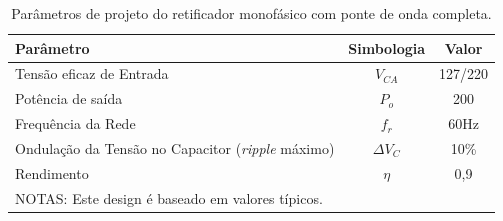 \begin{table}[H]
    \centering
    \footnotesize
    \caption{Parâmetros de projeto do retificador monofásico com ponte de onda completa.}
    \label{retificador}
    \begin{adjustbox}{max width = \textwidth}
        \begin{tabular}{|l|c|c|}
            \hline
            \rowcolor[HTML]{A8DADC}
            \textbf{Parâmetro} & \textbf{Simbologia} & \textbf{Valor}  \\ \hline
            Tensão eficaz de Entrada & $V_{CA}$ & 127/220
            \\ \hline
              Potência de saída & $P_{o}$	 & 200
             \\ \hline
              Frequência da Rede & $f_{r}$	 & 60Hz 
             \\ \hline
               Ondulação da Tensão no Capacitor (\textit{ripple} máximo) & $\Delta V_{C}$ & 10\%
             \\ \hline
                Rendimento & $\eta$ & 0,9
             \\ \hline
              \multicolumn{3}{l}{NOTAS: Este design é baseado em valores típicos.} \\ 
        \end{tabular}
    \end{adjustbox}
\end{table}

